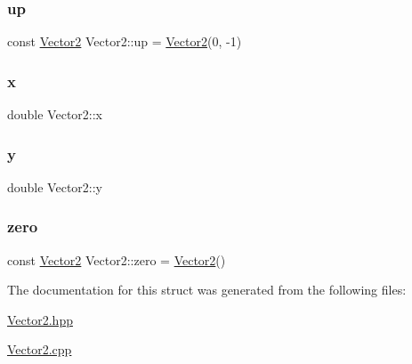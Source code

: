 \mbox{\label{struct_vector2_a0de964f9acb5cc8669d0b3b9f5b9d4eb}} 
\subsubsection{\texorpdfstring{up}{up}}
{\footnotesize\ttfamily const \mbox{\hyperlink{struct_vector2}{Vector2}} Vector2\+::up = \mbox{\hyperlink{struct_vector2}{Vector2}}(0, -\/1)\hspace{0.3cm}{\ttfamily [static]}}

\mbox{\label{struct_vector2_a61d73d9036ccbb3257fbe595c014a1d0}} 
\subsubsection{\texorpdfstring{x}{x}}
{\footnotesize\ttfamily double Vector2\+::x}

\mbox{\label{struct_vector2_a4df9b2a8e79e6e30a7a3b34722d8b8b8}} 
\subsubsection{\texorpdfstring{y}{y}}
{\footnotesize\ttfamily double Vector2\+::y}

\mbox{\label{struct_vector2_a28849e17f54c1c995f035544b5fd0a5f}} 
\subsubsection{\texorpdfstring{zero}{zero}}
{\footnotesize\ttfamily const \mbox{\hyperlink{struct_vector2}{Vector2}} Vector2\+::zero = \mbox{\hyperlink{struct_vector2}{Vector2}}()\hspace{0.3cm}{\ttfamily [static]}}



The documentation for this struct was generated from the following files\+:\begin{DoxyCompactItemize}
\item 
\mbox{\hyperlink{_vector2_8hpp}{Vector2.\+hpp}}\item 
\mbox{\hyperlink{_vector2_8cpp}{Vector2.\+cpp}}\end{DoxyCompactItemize}
